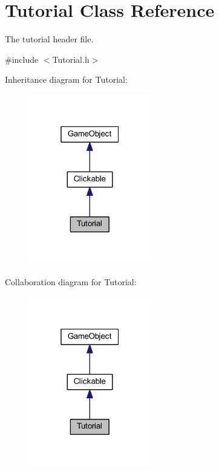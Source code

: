 \hypertarget{class_tutorial}{\section{Tutorial Class Reference}
\label{class_tutorial}
}


The tutorial header file.  




{\ttfamily \#include $<$Tutorial.\+h$>$}



Inheritance diagram for Tutorial\+:\nopagebreak
\begin{figure}[H]
\begin{center}
\leavevmode
\includegraphics[width=151pt]{class_tutorial__inherit__graph}
\end{center}
\end{figure}


Collaboration diagram for Tutorial\+:\nopagebreak
\begin{figure}[H]
\begin{center}
\leavevmode
\includegraphics[width=151pt]{class_tutorial__coll__graph}
\end{center}
\end{figure}
